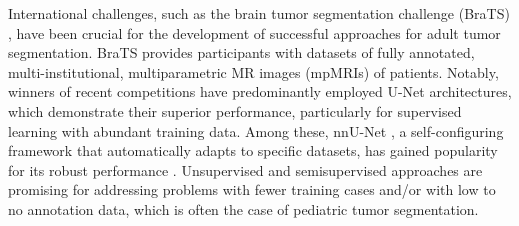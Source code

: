 \documentclass[runningheads]{llncs}
\begin{document}




International challenges, such as the brain tumor segmentation challenge (BraTS) \cite{menze2014multimodal}, have been crucial for the development of successful approaches for adult tumor segmentation. %
BraTS provides participants with datasets of fully annotated, multi-institutional, multiparametric MR images (mpMRIs) of patients. Notably, winners of recent competitions have predominantly employed U-Net architectures, which demonstrate their superior performance, particularly for supervised learning with abundant training data. Among these, nnU-Net \cite{isensee2021nnu}, a self-configuring framework that automatically adapts to specific datasets, has gained popularity for its robust performance \cite{vossough2024training,kharaji2024brain}. Unsupervised and semisupervised approaches are promising for addressing problems with fewer training cases and/or with low to no annotation data, which is often the case of pediatric tumor segmentation.
\end{document}
